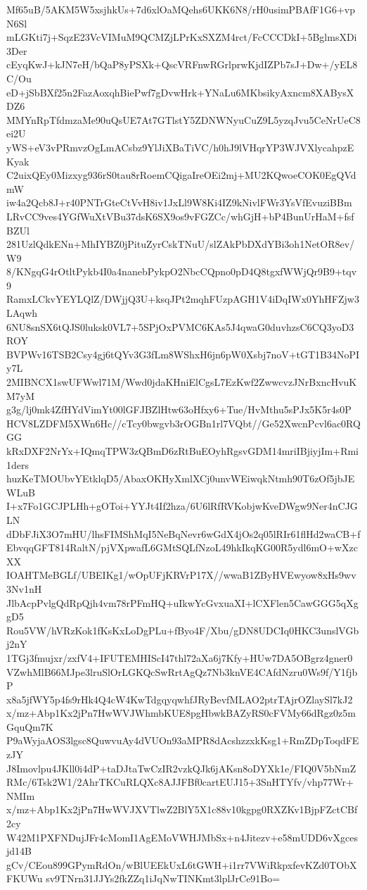 Mf65uB/5AKM5W5xsjhkUs+7d6xlOaMQehs6UKK6N8/rH0usimPBAfF1G6+vpN6Sl
mLGKti7j+SqzE23VcVIMuM9QCMZjLPrKxSXZM4rct/FcCCCDkI+5BglmsXDi3Der
cEyqKwJ+kJN7eH/bQaP8yPSXk+QscVRFnwRGrlprwKjdIZPb7sJ+Dw+/yEL8C/Ou
eD+jSbBXf25n2FazAoxqhBiePwf7gDvwHrk+YNaLu6MKbsikyAxncm8XABysXDZ6
MMYnRpTfdmzaMe90uQsUE7At7GTlstY5ZDNWNyuCuZ9L5yzqJvu5CeNrUeC8ei2U
yWS+eV3vPRmvzOgLmACsbz9YlJiXBaTiVC/h0hJ9lVHqrYP3WJVXlycahpzEKyak
C2uixQEy0Mizxyg936rS0tau8rRoemCQigaIreOEi2mj+MU2KQwoeCOK0EgQVdmW
iw4a2Qcb8J+r40PNTrGteCtVvH8iv1JxLl9W8Ki4IZ9kNivlFWr3YsVfEvuziBBm
LRvCC9ves4YGfWuXtVBu37dsK6SX9os9vFGZCc/whGjH+bP4BunUrHaM+fsfBZUl
281UzlQdkENn+MhIYBZ0jPituZyrCskTNuU/slZAkPbDXdYBi3oh1NetOR8ev/W9
8/KNgqG4rOtltPykb4I0a4nanebPykpO2NbcCQpno0pD4Q8tgxfWWjQr9B9+tqv9
RamxLCkvYEYLQlZ/DWjjQ3U+ksqJPt2mqhFUzpAGH1V4iDqIWx0YhHFZjw3LAqwh
6NU8snSX6tQJS0luksk0VL7+5SPjOxPVMC6KAs5J4qwaG0duvhzsC6CQ3yoD3ROY
BVPWv16TSB2Csy4gj6tQYv3G3fLm8WShxH6jn6pW0Xsbj7noV+tGT1B34NoPIy7L
2MIBNCX1swUFWwl71M/Wwd0jdaKHniElCgsL7EzKwf2ZwwcvzJNrBxncHvuKM7yM
g3g/lj0mk4ZfHYdVimYt00lGFJBZlHtw63oHfxy6+Tue/HvMthu5sPJx5K5r4s0P
HCV8LZDFM5XWn6Hc//cTcy0bwgvb3rOGBn1rl7VQbt//Ge52XwcnPcvl6ac0RQGG
kRxDXF2NrYx+IQmqTPW3zQBmD6zRtBuEOyhRgsvGDM14mriIBjiyjIm+Rmi1ders
huzKeTMOUbvYEtklqD5/AbaxOKHyXmlXCj0unvWEiwqkNtmh90T6zOf5jbJEWLuB
I+x7Fo1GCJPLHh+gOToi+YYJt4If2hza/6U6lRfRVKobjwKveDWgw9Ner4nCJGLN
dDbFJiX3O7mHU/lhsFIMShMqI5NeBqNevr6wGdX4jOs2q05lRIr61flHd2waCB+f
EbvqqGFT814RaltN/pjVXpwafL6GMtSQLfNzoL49hkIkqKG00R5ydl6mO+wXzcXX
IOAHTMeBGLf/UBEIKg1/wOpUFjKRVrP17X//wwaB1ZByHVEwyow8xHs9wv3Nv1nH
JlbAcpPvlgQdRpQjh4vm78rPFmHQ+uIkwYcGvxuaXI+lCXFlen5CawGGG5qXggD5
Rou5VW/hVRzKok1fKsKxLoDgPLu+fByo4F/Xbu/gDN8UDCIq0HKC3unslVGbj2nY
1TGj3fmujxr/zxfV4+IFUTEMHIScI47thl72aXa6j7Kfy+HUw7DA5OBgrz4gner0
VZwhMlB66MJpe3lruSlOrLGKQcSwRrtAgQz7Nb3knVE4CAfdNzru0Ws9f/Y1fjbP
x8a5jfWY5p4fs9rHk4Q4cW4KwTdgqyqwhfJRyBevfMLAO2ptrTAjrOZlaySl7kJ2
x/mz+Abp1Kx2jPn7HwWVJWhmbKUE8pgHbwkBAZyRS0cFVMy66dRgz0z5mGquQm7K
P9aWyjaAOS3lgsc8QuwvuAy4dVUOn93aMPR8dAcshzzxkKsg1+RmZDpToqdFEzJY
J8Imovlpu4JKll0i4dP+taDJtaTwCzIR2vzkQJk6jAKsn8oDYXk1e/FIQ0V5bNmZ
RMc/6Tsk2W1/2AhrTKCuRLQXc8AJJFBf0cartEUJ15+3SnHTYfv/vhp77Wr+NMIm
x/mz+Abp1Kx2jPn7HwWVJXVTlwZ2BlY5X1c88v10kgpg0RXZKv1BjpFZctCBf2cy
W42M1PXFNDujJFr4cMomI1AgEMoVWHJMbSx+n4Jitezv+e58mUDD6vXgcesjd14B
gCv/CEou899GPymRdOn/wBlUEEkUxL6tGWH+i1rr7VWiRkpxfevKZd0TObXFKUWu
sv9TNrn31JJYs2fkZZq1iJqNwTINKmt3lplJrCe91Bo=
